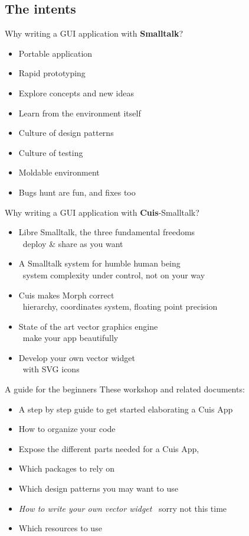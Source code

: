 \documentclass{beamer}
\newcommand{\tip}{\boldmath{\textcolor{red}{$\Rightarrow$}}}
\begin{document}
\subsection{The intents}
\begin{frame}{Why writing a GUI application with \textbf{Smalltalk}?}

  \begin{itemize}
  \item Portable application
  \item Rapid prototyping
  \item Explore concepts and new ideas
  \item Learn from the environment itself
  \item Culture of design patterns
  \item Culture of testing
  \item Moldable environment
  \item Bugs hunt are fun, and fixes too
  \end{itemize}
\end{frame}
%
\begin{frame}{Why writing a GUI application with \textbf{Cuis}-Smalltalk?}

  \begin{itemize}
  \item Libre Smalltalk, the three fundamental freedoms\\
    \tip\ deploy \& share as you want
  \item A Smalltalk system for humble human being\\
    \tip\ system complexity under control, not on your way
  \item Cuis makes Morph correct \\
    \tip\ hierarchy, coordinates system, floating point precision
  \item State of the art vector graphics engine \\
    \tip\ make your app beautifully 
  \item Develop your own vector widget \\
    \tip\ with \textsc{SVG} icons
  \end{itemize}
\end{frame}
%
\begin{frame}{A guide for the beginners}
  These workshop and related documents:
  \begin{itemize}
  \item A step by step guide to get started elaborating a Cuis App
  \item How to organize your code
  \item Expose the different parts needed for a Cuis App,
  \item Which packages to rely on
  \item Which design patterns you may want to use
  \item \emph{How to write your own vector widget} \tip\ sorry not this time
  \item Which resources to use
  \end{itemize}
\end{frame}
\end{document}
